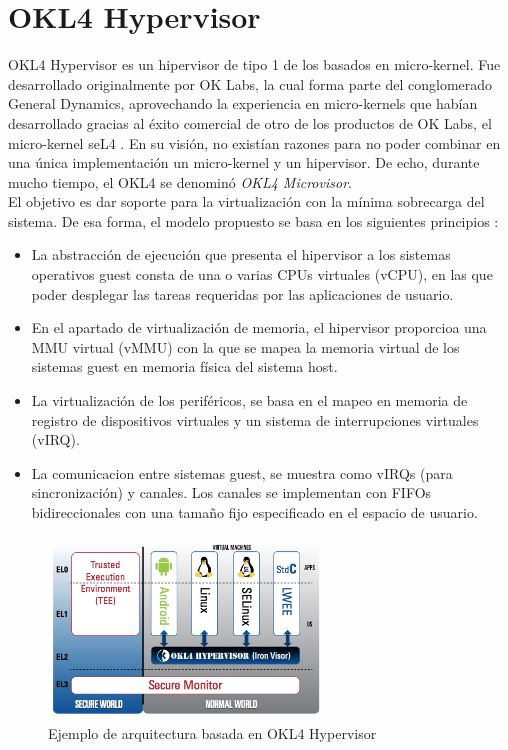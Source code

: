 \section{OKL4 Hypervisor}
OKL4 Hypervisor es un hipervisor de tipo 1 de los basados en micro-kernel. Fue desarrollado originalmente por OK Labs, la cual forma parte del conglomerado General Dynamics, aprovechando la experiencia en micro-kernels que habían desarrollado gracias al éxito comercial de otro de los productos de OK Labs, el micro-kernel seL4 \cite{seL4}. En su visión, no existían razones para no poder combinar en una única implementación un micro-kernel y un hipervisor. De echo, durante mucho tiempo, el OKL4 se denominó \textit{OKL4 Microvisor}.\\
El objetivo es dar soporte para la virtualización con la mínima sobrecarga del sistema. De esa forma, el modelo propuesto se basa en los siguientes principios \cite{okl4}:
\begin{itemize}
  \item La abstracción de ejecución que presenta el hipervisor a los sistemas operativos guest consta de una o varias CPUs virtuales (vCPU), en las que poder desplegar las tareas requeridas por las aplicaciones de usuario.
  \item En el apartado de virtualización de memoria, el hipervisor proporcioa una MMU virtual (vMMU) con la que se mapea la memoria virtual de los sistemas guest en memoria física del sistema host.
  \item La virtualización de los periféricos, se basa en el mapeo en memoria de registro de dispositivos virtuales y un sistema de interrupciones virtuales (vIRQ).
  \item La comunicacion entre sistemas guest, se muestra como vIRQs (para sincronización) y canales. Los canales se implementan con FIFOs bidireccionales con una tamaño fijo especificado en el espacio de usuario.
\end{itemize}
\begin{figure}[!htb]
	\centering
	\includegraphics[width=0.65\textwidth]{recursos/OK_L4_Microvisor.png}
	\caption{Ejemplo de arquitectura basada en OKL4 Hypervisor}
	\label{fig:OK_L4_Microvisor}
\end{figure}
